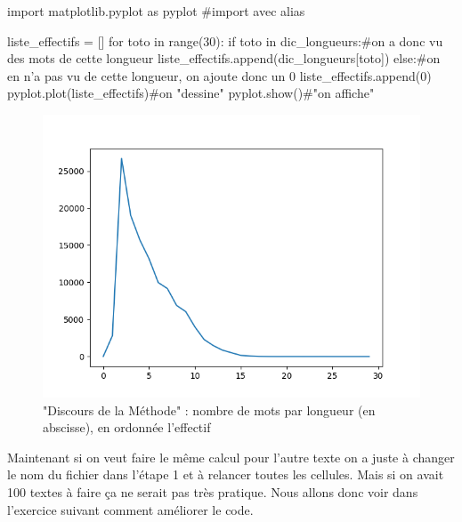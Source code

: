\begin{python}
import matplotlib.pyplot as pyplot #import avec alias

liste_effectifs = []
for toto in range(30):
  if toto in dic_longueurs:#on a donc vu des mots de cette longueur
    liste_effectifs.append(dic_longueurs[toto])
  else:#on en n'a pas vu de cette longueur, on ajoute donc un 0
    liste_effectifs.append(0)
pyplot.plot(liste_effectifs)#on "dessine"
pyplot.show()#"on affiche"

\end{python}

\begin{figure}
\begin{center}
\includegraphics[width=.5\textwidth]{images/TD1_effectifs1.png}
\caption{"Discours de la Méthode" : nombre de mots par longueur (en abscisse), en ordonnée l'effectif}
\end{center}
\end{figure}


Maintenant si on veut faire le même calcul pour l'autre texte on a juste à changer le nom du fichier dans l'étape 1 et à relancer toutes les cellules. Mais si on avait 100 textes à faire ça ne serait pas très pratique. Nous allons donc voir dans l'exercice suivant comment améliorer le code.
